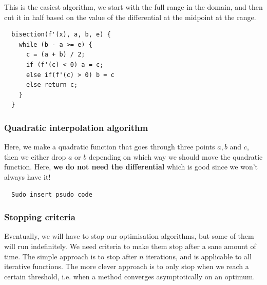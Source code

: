 This is the easiest algorithm, we start with the full range in the domain, and
then cut it in half based on the value of the differential at the midpoint at
the range.

\begin{verbatim}
  bisection(f'(x), a, b, e) {
    while (b - a >= e) {
      c = (a + b) / 2;
      if (f'(c) < 0) a = c;
      else if(f'(c) > 0) b = c
      else return c;
    }
  }
\end{verbatim}

\subsubsection{Quadratic interpolation algorithm}

Here, we make a quadratic function that goes through three points $a, b$ and
$c$, then we either drop $a$ or $b$ depending on which way we should move the
quadratic function. Here, \textbf{we do not need the differential} which is good
since we won't always have it!


\begin{verbatim}
  Sudo insert psudo code
\end{verbatim}

\subsubsection{Stopping criteria}

Eventually, we will have to stop our optimisation algorithms, but some of them
will run indefinitely. We need criteria to make them stop after a sane amount of
time. The simple approach is to stop after $n$ iterations, and is applicable to
all iterative functions. The more clever approach is to only stop when we reach
a certain threshold, i.e. when a method converges asymptotically on an optimum.
